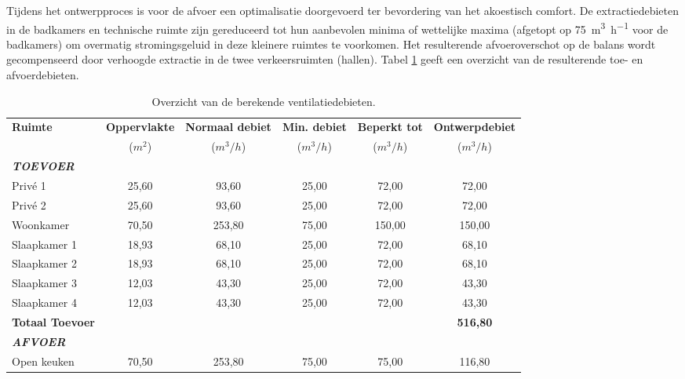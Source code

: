\documentclass[a4paper,12pt]{article}
\begin{document}
Tijdens het ontwerpproces is voor de afvoer een optimalisatie doorgevoerd ter bevordering van het akoestisch comfort. De extractiedebieten in de badkamers en technische ruimte zijn gereduceerd tot hun aanbevolen minima of wettelijke maxima (afgetopt op \qty{75}{\cubic\meter\per\hour} voor de badkamers) om overmatig stromingsgeluid in deze kleinere ruimtes te voorkomen. Het resulterende afvoeroverschot op de balans wordt gecompenseerd door verhoogde extractie in de twee verkeersruimten (hallen). Tabel \ref{tab:ventilatiedebieten}  geeft een overzicht van de resulterende toe- en afvoerdebieten.

\begin{table}[!ht]
    \centering
    \caption{Overzicht van de berekende ventilatiedebieten.}
    \label{tab:ventilatiedebieten}
    \begin{adjustbox}{max width=\textwidth} %
    \begin{tabular}{lccccc}
        \toprule
        \rowcolor{gray!20}
        \textbf{Ruimte} & \textbf{Oppervlakte} & \textbf{Normaal debiet} & \textbf{Min. debiet} & \textbf{Beperkt tot} & \textbf{Ontwerpdebiet} \\
        \rowcolor{gray!20}
        ~ & ($m^2$) & ($m^3/h$) & ($m^3/h$) & ($m^3/h$) & ($m^3/h$) \\
        \midrule
        \multicolumn{6}{l}{\textit{\textbf{TOEVOER}}} \\
        \midrule
        Privé 1 & 25,60 & 93,60 & 25,00 & 72,00 & 72,00 \\
        Privé 2 & 25,60 & 93,60 & 25,00 & 72,00 & 72,00 \\
        Woonkamer & 70,50 & 253,80 & 75,00 & 150,00 & 150,00 \\
        Slaapkamer 1 & 18,93 & 68,10 & 25,00 & 72,00 & 68,10 \\
        Slaapkamer 2 & 18,93 & 68,10 & 25,00 & 72,00 & 68,10 \\
        Slaapkamer 3 & 12,03 & 43,30 & 25,00 & 72,00 & 43,30 \\
        Slaapkamer 4 & 12,03 & 43,30 & 25,00 & 72,00 & 43,30 \\
        \cmidrule{5-6}
        \rowcolor{gray!20}
        \textbf{Totaal Toevoer} & ~ & ~ & ~ & ~ & \textbf{516,80} \\
        \midrule
        \multicolumn{6}{l}{\textit{\textbf{AFVOER}}} \\
        \midrule
        Open keuken & 70,50 & 253,80 & 75,00 & 75,00 & 116,80 \\

\end{tabular}
\end{adjustbox}
\end{table}
\end{document}
